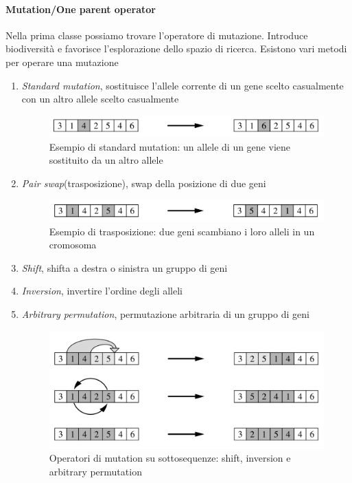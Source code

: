 \paragraph{Mutation/One parent operator}
Nella prima classe possiamo trovare l’operatore di mutazione. Introduce biodiversità e favorisce l’esplorazione dello spazio di ricerca. Esistono vari metodi per operare una mutazione
\begin{enumerate}
    \item \textit{Standard mutation}, sostituisce l'allele corrente di un gene scelto casualmente con un altro allele scelto casualmente   
    \begin{figure}[h]
        \centering
        \includegraphics[scale=0.35]{images/standard-mutation.png}
        \caption{Esempio di standard mutation: un allele di un gene viene sostituito da un altro allele}
    \end{figure}
    \item \textit{Pair swap}(trasposizione), swap della posizione di due geni
    \begin{figure}[h]
        \centering
        \includegraphics[scale=0.35]{images/pair-swap-mutation.png}
        \caption{Esempio di trasposizione: due geni scambiano i loro alleli in un cromosoma}
    \end{figure}
    \item \textit{Shift}, shifta a destra o sinistra un gruppo di geni
    \item \textit{Inversion}, invertire l'ordine degli alleli
    \item \textit{Arbitrary permutation}, permutazione arbitraria di un gruppo di geni
    \begin{figure}[h]
        \centering
        \includegraphics[scale=0.35]{images/shift-inversion-aribitrary.png}
        \caption{Operatori di mutation su sottosequenze: shift, inversion e arbitrary permutation}
    \end{figure}
\end{enumerate}
